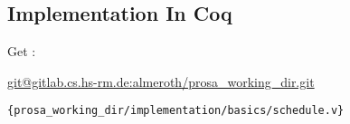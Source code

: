 \subsection{Implementation In Coq}

Get : 

\url{git@gitlab.cs.hs-rm.de:almeroth/prosa_working_dir.git}

\begin{lstlisting}
{prosa_working_dir/implementation/basics/schedule.v}
\end{lstlisting}